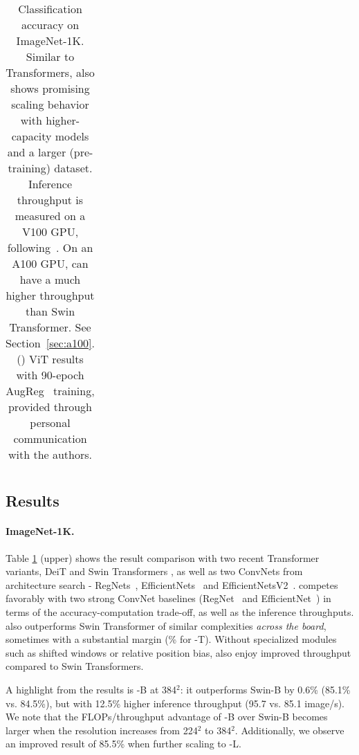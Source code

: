 \begin{table}[!htbp]
\begin{tabular}{lccccc}
\hline
\end{tabular}
\normalsize
\caption{Classification accuracy on ImageNet-1K. Similar to Transformers, \cnn{} also shows promising scaling behavior with higher-capacity models and a larger (pre-training) dataset. Inference throughput is measured on a V100 GPU, following~\cite{Liu2021swin}. On an A100 GPU, \cnn{} can have a much higher throughput than Swin Transformer. See Section~\ref{sec:a100}. (\Telefon) ViT results with 90-epoch AugReg~\cite{steiner2021train} training, provided through personal communication with the authors.}
\label{tab:imagenet-system}
\end{table}

\subsection{Results}
\label{subsec:imagenet-results}
\paragraph{ImageNet-1K.} Table \ref{tab:imagenet-system} (upper) shows the result comparison with two recent Transformer variants, DeiT \cite{Touvron2020} and Swin Transformers \cite{Liu2021swin}, as well as two ConvNets from architecture search - RegNets~\cite{Radosavovic2020designing}, EfficientNets~\cite{Tan2019efficientnet} and EfficientNetsV2~\cite{tan2021efficientnetv2}. \cnn{} competes favorably with two strong ConvNet baselines (RegNet~\cite{Radosavovic2020designing} and EfficientNet~\cite{Tan2019efficientnet}) in terms of the accuracy-computation trade-off, as well as the inference throughputs. \cnn{} also outperforms Swin Transformer of similar complexities \emph{across the board}, sometimes with a substantial margin (\% for \cnn{}-T). Without specialized modules such as shifted windows or relative position bias,  also enjoy improved throughput compared to Swin Transformers.

A highlight from the results is \cnn{}-B at 384$^2$: it outperforms Swin-B by 0.6\% (85.1\% vs. 84.5\%), but with 12.5\% higher inference throughput (95.7 vs. 85.1 image/s). We note that the FLOPs/throughput advantage of \cnn{}-B over Swin-B becomes larger when the resolution increases from 224$^2$ to 384$^2$. Additionally, we observe an improved result of 85.5\% when further scaling to \cnn{}-L.

